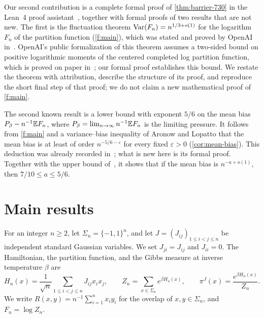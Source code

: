 Our second contribution is a complete formal proof of
\cref{thm:barrier-730} in the Lean~4 proof assistant~\cite{lean4,mathlib},
together with formal proofs of two results that are not new. The first is the
fluctuation theorem $\operatorname{Var}(F_n)=n^{1/3+o(1)}$ for the logarithm $F_n$ of the
partition function (\cref{f:main}), which was stated and proved by OpenAI
in~\cite[Theorem~1.1]{oai-fluctuations}. OpenAI's public formalization of
this theorem assumes a two-sided bound on positive logarithmic moments of
the centered completed log partition function, which is proved on paper
in~\cite[Proposition~7.5]{oai-fluctuations}; our formal proof establishes
this bound. We restate the theorem with attribution,
describe the structure of its proof, and reproduce the short final step of
that proof; we do not claim a new mathematical proof of \cref{f:main}.
\statusIntroShort

The second known result is a lower bound with exponent $5/6$ on the mean bias
$P_\beta-n^{-1}\mathbb E F_n$, where $P_\beta=\lim_{n\to\infty}n^{-1}\mathbb E F_n$ is the
limiting pressure. It follows from \cref{f:main} and a variance--bias
inequality of Aronow and Lopatto
\cite[Lemma~7.4 and Remark~7.14]{quantitative-parisi} that the mean bias is
at least of order $n^{-5/6-\varepsilon}$ for every fixed $\varepsilon>0$
(\cref{cor:mean-bias}). This deduction was already recorded
in~\cite[Section~1.6]{hexagon-bias}; what is new here is its formal proof.
Together with the upper bound of~\cite{hexagon-bias}, it shows that if the
mean bias is $n^{-a+o(1)}$, then $7/10\le a\le5/6$.

\section{Main results}\label{sec:intro-results}

For an integer $n\ge2$, let $\Sigma_n=\{-1,1\}^n$, and let
$J=(J_{ij})_{1\le i<j\le n}$ be independent standard Gaussian variables. We
set $J_{ji}=J_{ij}$ and $J_{ii}=0$. The Hamiltonian, the partition function,
and the Gibbs measure at inverse temperature $\beta$ are
\begin{equation}\label{eq:intro-model}
 H_n(x)=\frac1{\sqrt n}\sum_{1\le i<j\le n}J_{ij}x_ix_j,\qquad
 Z_n=\sum_{x\in\Sigma_n}e^{\beta H_n(x)},\qquad
 \pi^J(x)=\frac{e^{\beta H_n(x)}}{Z_n}.
\end{equation}
We write $R(x,y)=n^{-1}\sum_{i=1}^n x_iy_i$ for the overlap of
$x,y\in\Sigma_n$, and $F_n=\log Z_n$.


